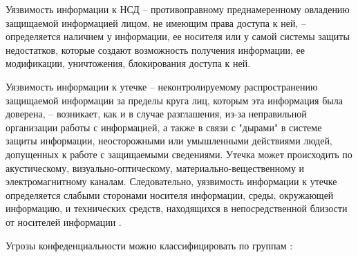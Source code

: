 Уязвимость информации к НСД – противоправному преднамеренному овладению защищаемой информацией лицом,
не имеющим права доступа к ней, – определяется наличием у информации, ее носителя или у самой системы
защиты недостатков, которые создают возможность получения информации, ее модификации, уничтожения,
блокирования доступа к ней.

Уязвимость информации к утечке – неконтролируемому распространению защищаемой информации за пределы круга лиц,
которым эта информация была доверена, – возникает, как и в случае разглашения, из-за неправильной организации
работы с информацией, а также в связи с "дырами" в системе защиты информации, неосторожными или умышленными
действиями людей, допущенных к работе с защищаемыми сведениями. Утечка может происходить по акустическому,
визуально-оптическому, материально-вещественному и электромагнитному каналам. Следовательно, уязвимость
информации к утечке определяется слабыми сторонами носителя информации, среды, окружающей информацию,
и технических средств, находящихся в непосредственной близости от носителей информации \cite{univermvd-eios}.

Угрозы конфеденциальности можно классифицировать по группам \cite{RT-SOLAR-conf}:

